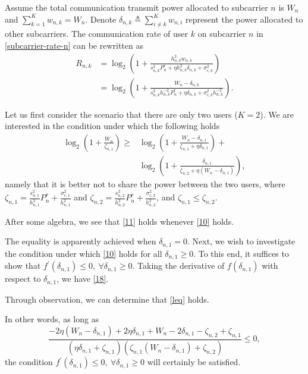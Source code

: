\documentclass[a4paper,journal,10pt]{IEEEtran}
\begin{document}
\begin{IEEEproof}
	Assume the total communication transmit power allocated to subcarrier $n$ is $W_{n}$ and $\sum_{k=1}^K w_{n,k}=W_{n}$. Denote $\delta_{n,k} \triangleq \sum_{i\neq k}^K w_{n,i}$ represent the power allocated to other subcarriers. The communication rate of user $k$ on subcarrier $n$ in \eqref{subcarrier-rate-n} can be rewritten as
	\begin{align}
		R_{n,k} & =\log _2\left(1+\frac{h_{n,k}^2 w_{n,k}}{s_{n,k}^2 P^r_{n}+\eta h_{n,k}^2 \delta_{n,k}+\sigma_{c,k}^2}\right) \nonumber \\
		& =\log _2\left(1+\frac{W_n-\delta_{n,k}}{s_{n,k}^2h_{n,k}^{-2}P^r_{n}+\eta \delta_{n,k}+\sigma_{c,k}^2 h_{n,k}^{-2}}\right) .
	\end{align}
 
Let us first consider the scenario that there are only two users ($K=2$). We are interested in the condition under which the following holds
\begin{align}\label{11}
    \log_2 \left(1\!+\!\frac{W_n}{\zeta_{n,1}}\right)\!\ge&\! \log_2 \left(1+\frac{W_n - \delta_{n,1}}{\zeta_{n,1}\!+\!\eta \delta_{n,1}}\right) 
        \!+ \nonumber \\
        &\!\log_2 \left(1\!+\!\frac{\delta_{n,1}}{\zeta_{n,2}+\eta(W_n -\delta_{n,1})} \right),
\end{align}
namely that it is better not to share the power between the two users, where $\zeta_{n,1}=\frac{s_{n,1}^2}{h_{n,1}^2}P^r_{n}+\frac{\sigma_{c,1}^2}{h_{n,1}^2}$ and $\zeta_{n,2}=\frac{s_{n,2}^2}{h_{n,2}^2}P^r_{n}+\frac{\sigma_{c,2}^2}{h_{n,2}^2}$, and $\zeta_{n,1}\leq \zeta_{n,2}$.

After some algebra, we see that \eqref{11} holds whenever \eqref{10} holds. 

The equality is apparently achieved when $\delta_{n,1}=0$. Next, we wish to investigate the condition under which \eqref{10} holds for all $\delta_{n,1}\geq 0$. To this end, it suffices to show that $f^{\prime}(\delta_{n,1})\leq 0,~\forall \delta_{n,1}\geq 0$. Taking the derivative of $f(\delta_{n,1})$ with respect to $\delta_{n,1}$, we have \eqref{18}.

Through observation, we can determine that \eqref{leq} holds.

In other words, as long as $$\frac{-2\eta (W_n-\delta_{n,1})+2\eta \delta_{n,1}+W_n-2\delta_{n,1} -\zeta_{n,2}+\zeta_{n,1}}{(\eta\delta_{n,1}+\zeta_{n,1})(\zeta_{n,1}(W_n-\delta_{n,1})+\zeta_{n,2})}\leq 0,$$ the condition $f^{\prime}(\delta_{n,1})\leq 0, ~\forall \delta_{n,1}\geq 0$ will certainly be satisfied.


\end{IEEEproof}
\end{document}
